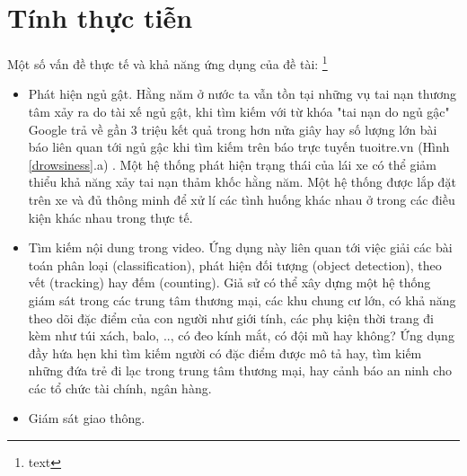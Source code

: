 \documentclass[a4paper]{report}
\begin{document}
\section{Tính thực tiễn}
Một số vấn đề thực tế và khả năng ứng dụng của đề tài: \footnote[3]{text}
\begin{itemize}
\item Phát hiện ngủ gật. Hằng năm ở nước ta vẫn tồn tại những vụ tai nạn thương tâm xảy 
ra do tài xế ngủ gật, khi tìm kiếm với từ khóa "tai nạn do ngủ gậc" Google trả về  gần 3 triệu kết 
quả trong hơn nửa giây hay số lượng lớn bài báo liên quan tới ngủ gậc khi tìm kiếm trên 
báo trực tuyến tuoitre.vn (Hình \ref{drowsiness}.a) . Một hệ thống phát hiện trạng thái của lái xe có thể giảm thiểu khả 
năng xảy tai nạn thảm khốc hằng năm. Một hệ thống được lắp đặt trên xe và đủ thông minh 
để xử lí các tình huống khác nhau ở trong các điều kiện khác nhau trong thực tế. 

\item Tìm kiếm nội dung trong video. Ứng dụng này liên quan tới việc giải các bài toán 
phân loại (classification), phát hiện đối tượng (object detection), theo vết (tracking) hay đếm (counting).
Giả sử có thể xây dựng một hệ thống giám sát trong các trung tâm thương mại, các khu chung cư lớn, 
có khả năng theo dõi đặc điểm của con người như giới tính, các phụ kiện thời trang đi kèm như túi xách, balo, ..,
có đeo kính mắt, có đội mũ hay không? Ứng dụng đầy hứa hẹn khi tìm kiếm người có đặc điểm được mô tả 
hay, tìm kiếm những đứa trẻ đi lạc trong trung tâm thương mại, hay cảnh báo an ninh cho các tổ chức tài
chính, ngân hàng. 

\item Giám sát giao thông. 
\end{itemize}
\end{document}
